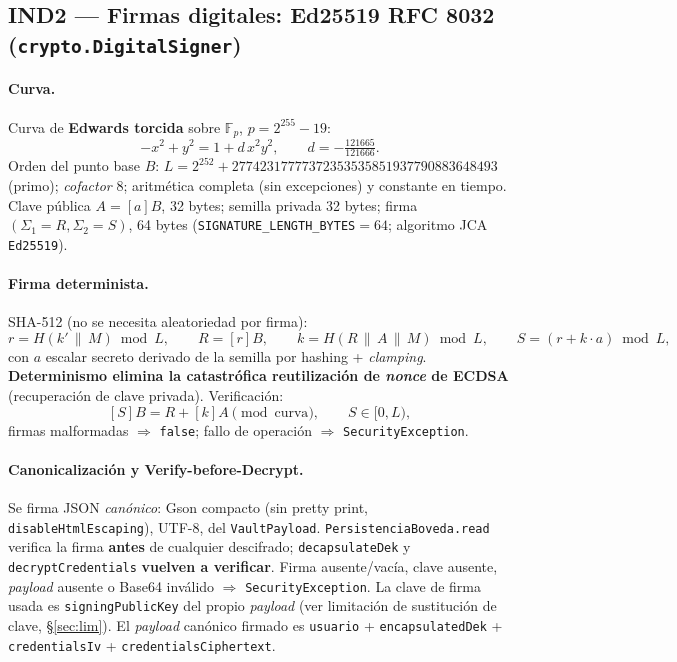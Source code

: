\documentclass[11pt,a4paper]{article}
\newcommand{\Fp}{\mathbb{F}_p}
\begin{document}
\subsection{IND2 --- Firmas digitales: Ed25519 RFC 8032 (\texttt{crypto.DigitalSigner})}
\paragraph{Curva.} Curva de \textbf{Edwards torcida} sobre $\Fp$, $p = 2^{255}-19$:
\[
  -x^2 + y^2 = 1 + d\,x^2 y^2,\qquad d = -\tfrac{121665}{121666}.
\]
Orden del punto base $B$: $L = 2^{252} + 27742317777372353535851937790883648493$
(primo); \emph{cofactor} 8; aritmética completa (sin excepciones) y constante en
tiempo. Clave pública $A = [a]B$, 32 bytes; semilla privada 32 bytes; firma
$(\Sigma_1=R,\Sigma_2=S)$, 64 bytes (\texttt{SIGNATURE\_LENGTH\_BYTES}$=64$;
algoritmo JCA \texttt{Ed25519}).
\paragraph{Firma determinista.} SHA-512 (no se necesita aleatoriedad por firma):
\[
  r = H(k' \,\|\, M) \bmod L,\qquad R = [r]B,\qquad
  k = H(R \,\|\, A \,\|\, M) \bmod L,\qquad
  S = (r + k\cdot a) \bmod L,
\]
con $a$ escalar secreto derivado de la semilla por hashing + \emph{clamping}.
\textbf{Determinismo elimina la catastrófica reutilización de \emph{nonce} de
ECDSA} (recuperación de clave privada). Verificación:
\[
  [S]B = R + [k]A \pmod{\text{curva}},\qquad S \in [0, L),
\]
firmas malformadas $\Rightarrow$ \texttt{false}; fallo de operación $\Rightarrow$
\texttt{SecurityException}.
\paragraph{Canonicalización y Verify-before-Decrypt.} Se firma JSON
\emph{canónico}: Gson compacto (sin pretty print, \texttt{disableHtmlEscaping}),
UTF-8, del \texttt{VaultPayload}. \texttt{PersistenciaBoveda.read} verifica la
firma \textbf{antes} de cualquier descifrado; \texttt{decapsulateDek} y
\texttt{decryptCredentials} \textbf{vuelven a verificar}. Firma ausente/vacía,
clave ausente, \emph{payload} ausente o Base64 inválido $\Rightarrow$
\texttt{SecurityException}. La clave de firma usada es \texttt{signingPublicKey}
del propio \emph{payload} (ver limitación de sustitución de clave, §\ref{sec:lim}).
El \emph{payload} canónico firmado es \texttt{usuario} + \texttt{encapsulatedDek}
+ \texttt{credentialsIv} + \texttt{credentialsCiphertext}.
\end{document}
